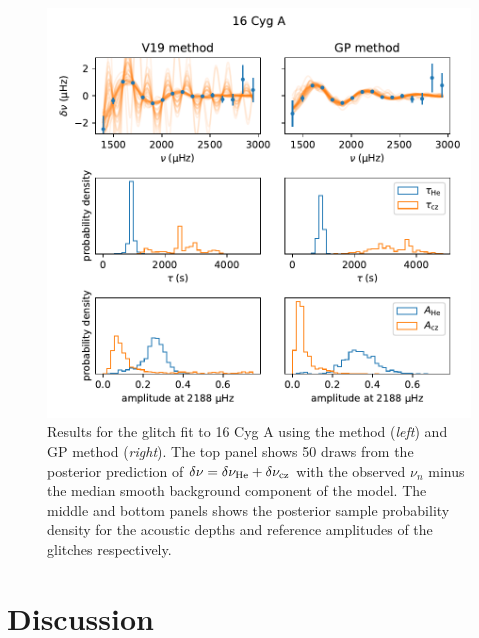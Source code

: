 \begin{figure}[!tb]
    \centering
    \includegraphics{figures/glitch-16cyga.pdf}
    \caption{Results for the glitch fit to 16 Cyg A using the  method (\emph{left}) and GP method (\emph{right}). The top panel shows 50 draws from the posterior prediction of \(\delta\nu = \delta\nu_{{\mathrm{He}}} + \delta\nu_{{\mathrm{cz}}}\) with the observed \(\nu_n\) minus the median smooth background component of the model. The middle and bottom panels shows the posterior sample probability density for the acoustic depths and reference amplitudes of the glitches respectively.}
    \label{fig:glitch-16cyga}
\end{figure}

\section{Discussion}\label{sec:glitch-disc}


